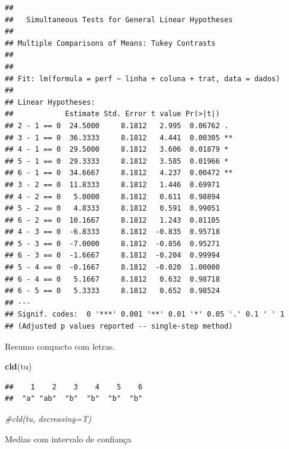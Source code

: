 \documentclass[
]{book}
\newenvironment{Shaded}{\begin{snugshade}}{\end{snugshade}}
\newcommand{\CommentTok}[1]{\textcolor[rgb]{0.56,0.35,0.01}{\textit{#1}}}
\newcommand{\DataTypeTok}[1]{\textcolor[rgb]{0.13,0.29,0.53}{#1}}
\newcommand{\KeywordTok}[1]{\textcolor[rgb]{0.13,0.29,0.53}{\textbf{#1}}}
\newcommand{\NormalTok}[1]{#1}
\newcommand{\OperatorTok}[1]{\textcolor[rgb]{0.81,0.36,0.00}{\textbf{#1}}}
\newcommand{\StringTok}[1]{\textcolor[rgb]{0.31,0.60,0.02}{#1}}
\begin{document}
\begin{verbatim}
## 
##   Simultaneous Tests for General Linear Hypotheses
## 
## Multiple Comparisons of Means: Tukey Contrasts
## 
## 
## Fit: lm(formula = perf ~ linha + coluna + trat, data = dados)
## 
## Linear Hypotheses:
##            Estimate Std. Error t value Pr(>|t|)   
## 2 - 1 == 0  24.5000     8.1812   2.995  0.06762 . 
## 3 - 1 == 0  36.3333     8.1812   4.441  0.00305 **
## 4 - 1 == 0  29.5000     8.1812   3.606  0.01879 * 
## 5 - 1 == 0  29.3333     8.1812   3.585  0.01966 * 
## 6 - 1 == 0  34.6667     8.1812   4.237  0.00472 **
## 3 - 2 == 0  11.8333     8.1812   1.446  0.69971   
## 4 - 2 == 0   5.0000     8.1812   0.611  0.98894   
## 5 - 2 == 0   4.8333     8.1812   0.591  0.99051   
## 6 - 2 == 0  10.1667     8.1812   1.243  0.81105   
## 4 - 3 == 0  -6.8333     8.1812  -0.835  0.95718   
## 5 - 3 == 0  -7.0000     8.1812  -0.856  0.95271   
## 6 - 3 == 0  -1.6667     8.1812  -0.204  0.99994   
## 5 - 4 == 0  -0.1667     8.1812  -0.020  1.00000   
## 6 - 4 == 0   5.1667     8.1812   0.632  0.98718   
## 6 - 5 == 0   5.3333     8.1812   0.652  0.98524   
## ---
## Signif. codes:  0 '***' 0.001 '**' 0.01 '*' 0.05 '.' 0.1 ' ' 1
## (Adjusted p values reported -- single-step method)
\end{verbatim}

Resumo compacto com letras.

\begin{Shaded}
\begin{Highlighting}[]
\KeywordTok{cld}\NormalTok{(tu)}
\end{Highlighting}
\end{Shaded}

\begin{verbatim}
##    1    2    3    4    5    6 
##  "a" "ab"  "b"  "b"  "b"  "b"
\end{verbatim}

\begin{Shaded}
\begin{Highlighting}[]
\CommentTok{#cld(tu, decreasing=T)}
\end{Highlighting}
\end{Shaded}

Medias com intervalo de confiança

\begin{Shaded}
\end{Shaded}
\end{document}
